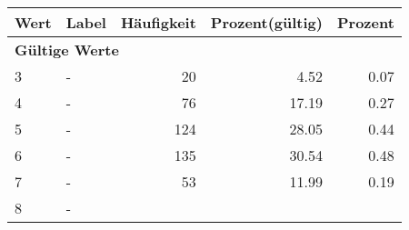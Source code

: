      \begin{longtable}{lXrrr}
     \toprule
     \textbf{Wert} & \textbf{Label} & \textbf{Häufigkeit} & \textbf{Prozent(gültig)} & \textbf{Prozent} \\
     \endhead
     \midrule
     \multicolumn{5}{l}{\textbf{Gültige Werte}}\\

     3 &
     \multicolumn{1}{X}{ -  } &


       \num{20} &
       \num[round-mode=places,round-precision=2]{4,52} &
         \num[round-mode=places,round-precision=2]{0,07} \\

     4 &
     \multicolumn{1}{X}{ -  } &


       \num{76} &
       \num[round-mode=places,round-precision=2]{17,19} &
         \num[round-mode=places,round-precision=2]{0,27} \\

     5 &
     \multicolumn{1}{X}{ -  } &


       \num{124} &
       \num[round-mode=places,round-precision=2]{28,05} &
         \num[round-mode=places,round-precision=2]{0,44} \\

     6 &
     \multicolumn{1}{X}{ -  } &


       \num{135} &
       \num[round-mode=places,round-precision=2]{30,54} &
         \num[round-mode=places,round-precision=2]{0,48} \\

     7 &
     \multicolumn{1}{X}{ -  } &


       \num{53} &
       \num[round-mode=places,round-precision=2]{11,99} &
         \num[round-mode=places,round-precision=2]{0,19} \\

     8 &
     \multicolumn{1}{X}{ -  } &



\end{longtable}
